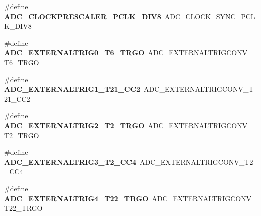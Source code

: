 \begin{DoxyCompactItemize}
\item 
\mbox{\label{group___h_a_l___a_d_c___aliased___defines_ga93ccda8f421de00a2aa5b0b19b665393}} 
\#define {\bfseries A\+D\+C\+\_\+\+C\+L\+O\+C\+K\+P\+R\+E\+S\+C\+A\+L\+E\+R\+\_\+\+P\+C\+L\+K\+\_\+\+D\+I\+V8}~A\+D\+C\+\_\+\+C\+L\+O\+C\+K\+\_\+\+S\+Y\+N\+C\+\_\+\+P\+C\+L\+K\+\_\+\+D\+I\+V8
\item 
\mbox{\label{group___h_a_l___a_d_c___aliased___defines_ga72d7fcd1d65274786de2b3ccd6b853c4}} 
\#define {\bfseries A\+D\+C\+\_\+\+E\+X\+T\+E\+R\+N\+A\+L\+T\+R\+I\+G0\+\_\+\+T6\+\_\+\+T\+R\+GO}~A\+D\+C\+\_\+\+E\+X\+T\+E\+R\+N\+A\+L\+T\+R\+I\+G\+C\+O\+N\+V\+\_\+\+T6\+\_\+\+T\+R\+GO
\item 
\mbox{\label{group___h_a_l___a_d_c___aliased___defines_gab001be8f7abe45ddf92a476a65c6dd50}} 
\#define {\bfseries A\+D\+C\+\_\+\+E\+X\+T\+E\+R\+N\+A\+L\+T\+R\+I\+G1\+\_\+\+T21\+\_\+\+C\+C2}~A\+D\+C\+\_\+\+E\+X\+T\+E\+R\+N\+A\+L\+T\+R\+I\+G\+C\+O\+N\+V\+\_\+\+T21\+\_\+\+C\+C2
\item 
\mbox{\label{group___h_a_l___a_d_c___aliased___defines_gaad24eb6d74f2e4396d59afc4c715a053}} 
\#define {\bfseries A\+D\+C\+\_\+\+E\+X\+T\+E\+R\+N\+A\+L\+T\+R\+I\+G2\+\_\+\+T2\+\_\+\+T\+R\+GO}~A\+D\+C\+\_\+\+E\+X\+T\+E\+R\+N\+A\+L\+T\+R\+I\+G\+C\+O\+N\+V\+\_\+\+T2\+\_\+\+T\+R\+GO
\item 
\mbox{\label{group___h_a_l___a_d_c___aliased___defines_gaa0f8054b3363d13a190ee0d366363575}} 
\#define {\bfseries A\+D\+C\+\_\+\+E\+X\+T\+E\+R\+N\+A\+L\+T\+R\+I\+G3\+\_\+\+T2\+\_\+\+C\+C4}~A\+D\+C\+\_\+\+E\+X\+T\+E\+R\+N\+A\+L\+T\+R\+I\+G\+C\+O\+N\+V\+\_\+\+T2\+\_\+\+C\+C4
\item 
\mbox{\label{group___h_a_l___a_d_c___aliased___defines_ga671cb20b99d24f3c9923ac7777e5f84e}} 
\#define {\bfseries A\+D\+C\+\_\+\+E\+X\+T\+E\+R\+N\+A\+L\+T\+R\+I\+G4\+\_\+\+T22\+\_\+\+T\+R\+GO}~A\+D\+C\+\_\+\+E\+X\+T\+E\+R\+N\+A\+L\+T\+R\+I\+G\+C\+O\+N\+V\+\_\+\+T22\+\_\+\+T\+R\+GO
\item 
\mbox{\label{group___h_a_l___a_d_c___aliased___defines_ga54407c5dc446f7d5425d8ac135bee69e}} 

\end{DoxyCompactItemize}
